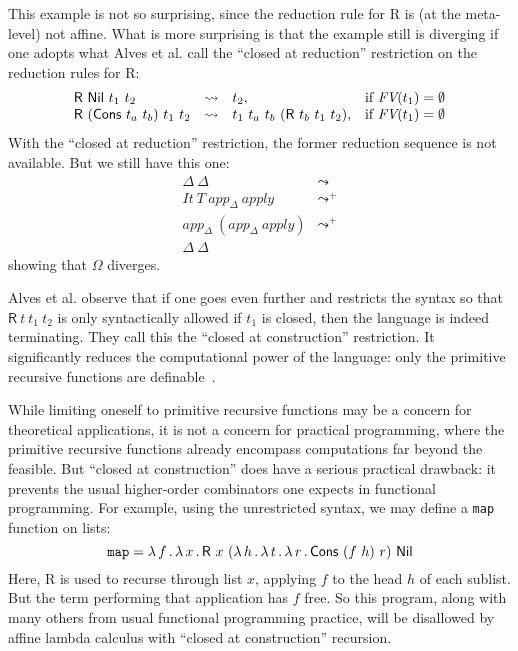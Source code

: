 \documentclass{article}
\begin{document}
This example is not so surprising, since the reduction rule for
\textsf{R} is (at the meta-level) not affine.  What is more surprising
is that the example still is diverging if one adopts what Alves et al.
call the ``closed at reduction'' restriction on the reduction
rules for \textsf{R}:
  \[
  \begin{array}{lllll}
    \mathsf{R}\ \mathsf{Nil}\ t_1\ t_2 & \leadsto & t_2, & \textnormal{if } \textit{FV}(t_1) = \emptyset\\
    \mathsf{R}\ (\mathsf{Cons}\ t_a\ t_b)\ t_1\ t_2 & \leadsto & t_1\ t_a\ t_b\ (\mathsf{R}\ t_b\ t_1\ t_2),& \textnormal{if } \textit{FV}(t_1) = \emptyset
  \end{array}
  \]
\noindent With the ``closed at reduction'' restriction, the former
reduction sequence is not available.  But we still have this one:
\[
\begin{array}{ll}
  \Delta\ \Delta & \leadsto \\
  \textit{It}\ T\ \textit{app}_\Delta\ \textit{apply} & \leadsto^+ \\
  \textit{app}_\Delta\ (\textit{app}_\Delta\ \textit{apply}) & \leadsto^+ \\
  \Delta\ \Delta& \
\end{array}
\]
\noindent showing that $\Omega$ diverges.

Alves et al. observe that if one goes even further and restricts the
syntax so that $\mathsf{R}\ t\ t_1\ t_2$ is only syntactically allowed
if $t_1$ is closed, then the language is indeed terminating.  They
call this the ``closed at construction'' restriction.  It
significantly reduces the computational power of the language: only
the primitive recursive functions are definable~\cite{alves10}.

While limiting oneself to primitive recursive functions may be a
concern for theoretical applications, it is not a concern for
practical programming, where the primitive recursive functions already
encompass computations far beyond the feasible.  But ``closed at construction''
does have a serious practical drawback: it prevents the usual higher-order
combinators one expects in functional programming.  For example, using the
unrestricted syntax, we may define a \texttt{map} function on lists:
\[
\texttt{map} = \lam{f}{\lam{x}{\mathsf{R}\ x\ (\lam{h}{\lam{t}{\lam{r}{\mathsf{Cons}\ (f\ h)\ r}}})\ \mathsf{Nil}}}
\]
\noindent Here, \textsf{R} is used to recurse through list $x$,
applying $f$ to the head $h$ of each sublist.  But the term performing
that application has $f$ free.  So this program, along with many
others from usual functional programming practice, will be disallowed
by affine lambda calculus with ``closed at construction'' recursion.
\end{document}
